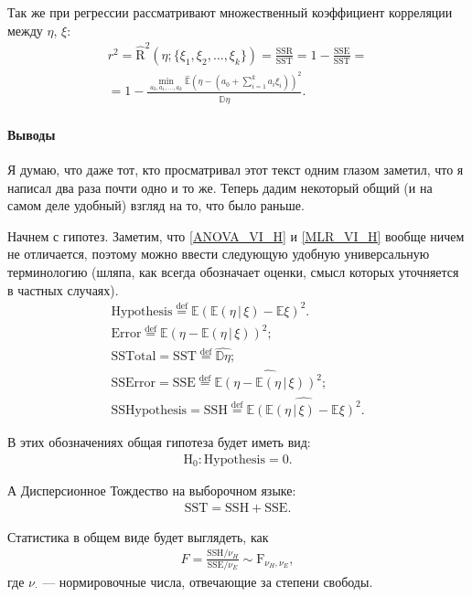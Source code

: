 Так же при регрессии рассматривают множественный коэффициент корреляции между $\eta$, $\xi$:
\begin{gather}
    \nonumber
    r^2 = \hat {\mathrm R}^2(\eta; \{\xi_1, \xi_2, \ldots, \xi_k\}) = \mathrm{\frac{SSR}{SST}} = 1 - \mathrm{\frac{SSE}{SST}} = \\ =
    \label{MLR_coef_cor}
    1 - \frac{\min_{a_0, a_1, \ldots, a_k} \hat {\mathbb E}(\eta - (a_0 + \sum_{i=1}^k a_i \xi_i))^2}{\widehat {\mathbb D} \eta}.
\end{gather}

\paragraph{Выводы}
Я думаю, что даже тот, кто просматривал этот текст одним глазом заметил, что я написал два раза почти одно и то же.
Теперь дадим некоторый общий (и на самом деле удобный) взгляд на то, что было раньше.

Начнем с гипотез. Заметим, что \eqref{ANOVA_VI_H} и \eqref{MLR_VI_H} вообще ничем не отличается, поэтому можно ввести следующую удобную универсальную терминологию (шляпа, как всегда обозначает оценки, смысл которых уточняется в частных случаях).
\begin{gather*}
    \mathrm {Hypothesis} \overset{\mathrm{def}}{=} \mathbb E(\mathbb E(\eta\, | \, \xi) - \mathbb E \xi)^2.\\
    \mathrm {Error} \overset{\mathrm{def}}{=} \mathbb E(\eta - \mathbb E(\eta\, | \, \xi))^2;\\
    \mathrm {SS Total} = \mathrm {SST} \overset{\mathrm{def}}{=} \widehat{\mathbb D \eta};\\
    \mathrm {SS Error} = \mathrm {SSE} \overset{\mathrm{def}}{=} \widehat{\mathbb E(\eta - \mathbb E(\eta\, | \, \xi))^2};\\
    \mathrm {SS Hypothesis} = \mathrm {SSH} \overset{\mathrm{def}}{=} \widehat{\mathbb E(\mathbb E(\eta\, | \, \xi) - \mathbb E \xi)^2}.
\end{gather*}

В этих обозначениях общая гипотеза будет иметь вид:
\begin{gather*}
    \mathrm H_0: \mathrm{Hypothesis} = 0.
\end{gather*}

А Дисперсионное Тождество на выборочном языке:
\begin{gather*}
    \mathrm{SST = SSH + SSE}.
\end{gather*}

Статистика в общем виде будет выглядеть, как
\begin{gather*}
    F = \frac{\mathrm{SSH} / \nu_H}{\mathrm{SSE} / \nu_E} \sim \mathrm F_{\nu_H, \nu_E},
\end{gather*}
где $\nu_\cdot$ --- нормировочные числа, отвечающие за степени свободы.

